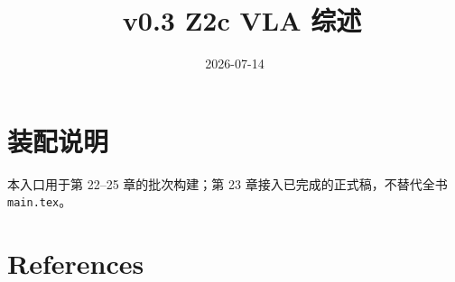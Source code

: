 \documentclass[UTF8,a4paper,12pt,openany]{ctexbook}
\title{\ReportTitle\ v0.3 Z2c VLA 综述}
\author{\ReportAuthor}
\date{2026-07-14}
\begin{document}
\frontmatter
\maketitle
\chapter*{装配说明}
本入口用于第 22--25 章的批次构建；第 23 章接入已完成的正式稿，不替代全书 \texttt{main.tex}。
\tableofcontents
\mainmatter
\setcounter{chapter}{21}




\backmatter
\chapter{References}
\printbibliography[heading=none]
\end{document}
